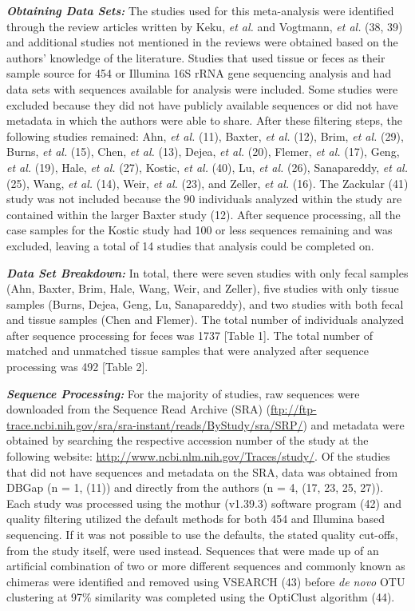 \documentclass[12pt,]{article}
\begin{document}
\textbf{\emph{Obtaining Data Sets:}} The studies used for this
meta-analysis were identified through the review articles written by
Keku, \emph{et al.} and Vogtmann, \emph{et al.} (38, 39) and additional
studies not mentioned in the reviews were obtained based on the authors'
knowledge of the literature. Studies that used tissue or feces as their
sample source for 454 or Illumina 16S rRNA gene sequencing analysis and
had data sets with sequences available for analysis were included. Some
studies were excluded because they did not have publicly available
sequences or did not have metadata in which the authors were able to
share. After these filtering steps, the following studies remained: Ahn,
\emph{et al.} (11), Baxter, \emph{et al.} (12), Brim, \emph{et al.}
(29), Burns, \emph{et al.} (15), Chen, \emph{et al.} (13), Dejea,
\emph{et al.} (20), Flemer, \emph{et al.} (17), Geng, \emph{et al.}
(19), Hale, \emph{et al.} (27), Kostic, \emph{et al.} (40), Lu, \emph{et
al.} (26), Sanapareddy, \emph{et al.} (25), Wang, \emph{et al.} (14),
Weir, \emph{et al.} (23), and Zeller, \emph{et al.} (16). The Zackular
(41) study was not included because the 90 individuals analyzed within
the study are contained within the larger Baxter study (12). After
sequence processing, all the case samples for the Kostic study had 100
or less sequences remaining and was excluded, leaving a total of 14
studies that analysis could be completed on.

\textbf{\emph{Data Set Breakdown:}} In total, there were seven studies
with only fecal samples (Ahn, Baxter, Brim, Hale, Wang, Weir, and
Zeller), five studies with only tissue samples (Burns, Dejea, Geng, Lu,
Sanapareddy), and two studies with both fecal and tissue samples (Chen
and Flemer). The total number of individuals analyzed after sequence
processing for feces was 1737 {[}Table 1{]}. The total number of matched
and unmatched tissue samples that were analyzed after sequence
processing was 492 {[}Table 2{]}.

\textbf{\emph{Sequence Processing:}} For the majority of studies, raw
sequences were downloaded from the Sequence Read Archive (SRA)
(\url{ftp://ftp-trace.ncbi.nih.gov/sra/sra-instant/reads/ByStudy/sra/SRP/})
and metadata were obtained by searching the respective accession number
of the study at the following website:
\url{http://www.ncbi.nlm.nih.gov/Traces/study/}. Of the studies that did
not have sequences and metadata on the SRA, data was obtained from DBGap
(n = 1, (11)) and directly from the authors (n = 4, (17, 23, 25, 27)).
Each study was processed using the mothur (v1.39.3) software program
(42) and quality filtering utilized the default methods for both 454 and
Illumina based sequencing. If it was not possible to use the defaults,
the stated quality cut-offs, from the study itself, were used instead.
Sequences that were made up of an artificial combination of two or more
different sequences and commonly known as chimeras were identified and
removed using VSEARCH (43) before \emph{de novo} OTU clustering at 97\%
similarity was completed using the OptiClust algorithm (44).
\end{document}
